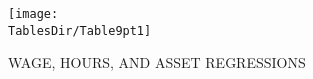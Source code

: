\hypertarget{Regressions1}{}
\begin{table}
  \centerline{\texttt{[image: \\TablesDir/Table9pt1]}}
  \caption{\scriptsize WAGE, HOURS, AND ASSET REGRESSIONS} 
  \label{tab:Regressions1}
\end{table}